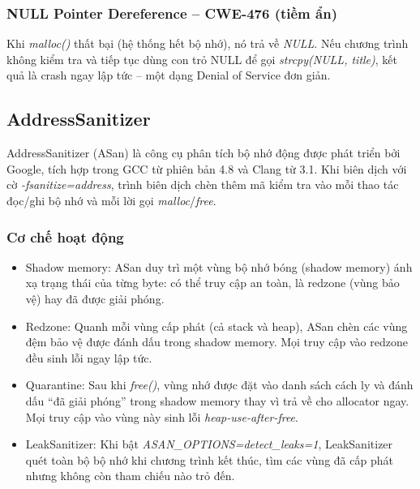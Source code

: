 \subsubsection{NULL Pointer Dereference -- CWE-476 (tiềm ẩn)}

Khi \textit{malloc()} thất bại (hệ thống hết bộ nhớ), nó trả về \textit{NULL}.
Nếu chương trình không kiểm tra và tiếp tục dùng con trỏ NULL để gọi
\textit{strcpy(NULL, title)}, kết quả là crash ngay lập tức -- một dạng
Denial of Service đơn giản.

\subsection{AddressSanitizer}

AddressSanitizer (ASan) là công cụ phân tích bộ nhớ động được phát triển bởi
Google, tích hợp trong GCC từ phiên bản 4.8 và Clang từ 3.1. Khi biên dịch với
cờ \textit{-fsanitize=address}, trình biên dịch chèn thêm mã kiểm tra vào mỗi
thao tác đọc/ghi bộ nhớ và mỗi lời gọi \textit{malloc}/\textit{free}.

\subsubsection{Cơ chế hoạt động}

\begin{itemize}
    \item Shadow memory: ASan duy trì một vùng bộ nhớ bóng (shadow
          memory) ánh xạ trạng thái của từng byte: có thể truy cập an toàn,
          là redzone (vùng bảo vệ) hay đã được giải phóng.
    \item Redzone: Quanh mỗi vùng cấp phát (cả stack và heap), ASan
          chèn các vùng đệm bảo vệ được đánh dấu trong shadow memory. Mọi
          truy cập vào redzone đều sinh lỗi ngay lập tức.
    \item Quarantine: Sau khi \textit{free()}, vùng nhớ được đặt vào
          danh sách cách ly và đánh dấu ``đã giải phóng'' trong shadow memory
          thay vì trả về cho allocator ngay. Mọi truy cập vào vùng này sinh
          lỗi \textit{heap-use-after-free}.
    \item LeakSanitizer: Khi bật \textit{ASAN\_OPTIONS=detect\_leaks=1},
          LeakSanitizer quét toàn bộ bộ nhớ khi chương trình kết thúc, tìm
          các vùng đã cấp phát nhưng không còn tham chiếu nào trỏ đến.
\end{itemize}

